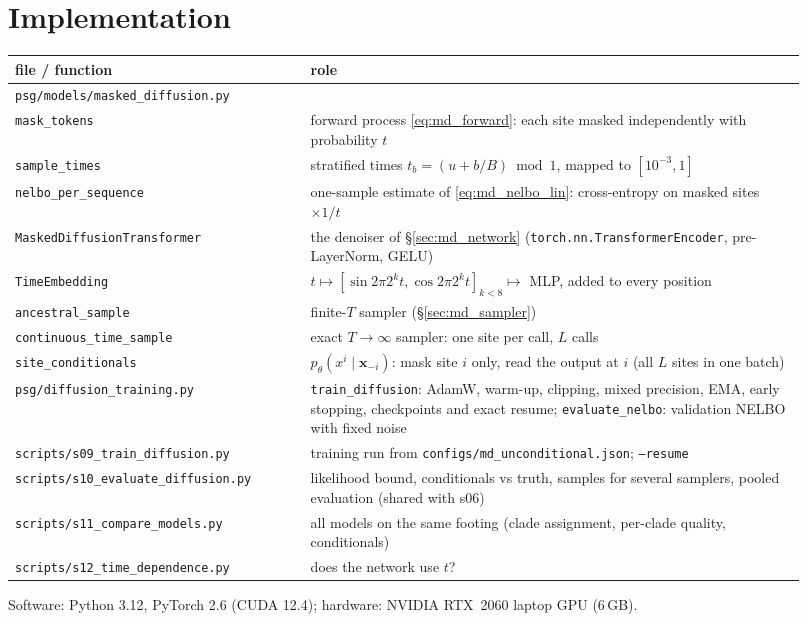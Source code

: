 
\section{Implementation}\label{sec:md_impl}
\begin{center}\footnotesize
\begin{tabular}{p{0.34\linewidth}p{0.58\linewidth}}
\toprule
file / function & role\\
\midrule
\texttt{psg/models/masked\_diffusion.py} & \\
\quad\texttt{mask\_tokens} & forward process \eqref{eq:md_forward}: each site masked independently with probability $t$\\
\quad\texttt{sample\_times} & stratified times $t_b=(u+b/B)\bmod1$, mapped to $[10^{-3},1]$\\
\quad\texttt{nelbo\_per\_sequence} & one-sample estimate of \eqref{eq:md_nelbo_lin}: cross-entropy on masked sites $\times1/t$\\
\quad\texttt{MaskedDiffusionTransformer} & the denoiser of \S\ref{sec:md_network} (\texttt{torch.nn.TransformerEncoder}, pre-LayerNorm, GELU)\\
\quad\texttt{TimeEmbedding} & $t\mapsto[\sin2\pi2^kt,\cos2\pi2^kt]_{k<8}\mapsto$ MLP, added to every position\\
\quad\texttt{ancestral\_sample} & finite-$T$ sampler (\S\ref{sec:md_sampler})\\
\quad\texttt{continuous\_time\_sample} & exact $T\to\infty$ sampler: one site per call, $L$ calls\\
\quad\texttt{site\_conditionals} & $p_\theta(x^i\mid\bm x_{-i})$: mask site $i$ only, read the output at $i$ (all $L$ sites in one batch)\\
\texttt{psg/diffusion\_training.py} & \texttt{train\_diffusion}: AdamW, warm-up, clipping, mixed precision, EMA, early stopping, checkpoints and exact resume;
\texttt{evaluate\_nelbo}: validation NELBO with fixed noise\\
\texttt{scripts/s09\_train\_diffusion.py} & training run from \texttt{configs/md\_unconditional.json}; \texttt{--resume}\\
\texttt{scripts/s10\_evaluate\_diffusion.py} & likelihood bound, conditionals vs truth, samples for several samplers, pooled evaluation (shared with s06)\\
\texttt{scripts/s11\_compare\_models.py} & all models on the same footing (clade assignment, per-clade quality, conditionals)\\
\texttt{scripts/s12\_time\_dependence.py} & does the network use $t$?\\
\bottomrule
\end{tabular}
\end{center}
Software: Python 3.12, PyTorch 2.6 (CUDA 12.4); hardware: NVIDIA RTX~2060 laptop GPU (6\,GB).

